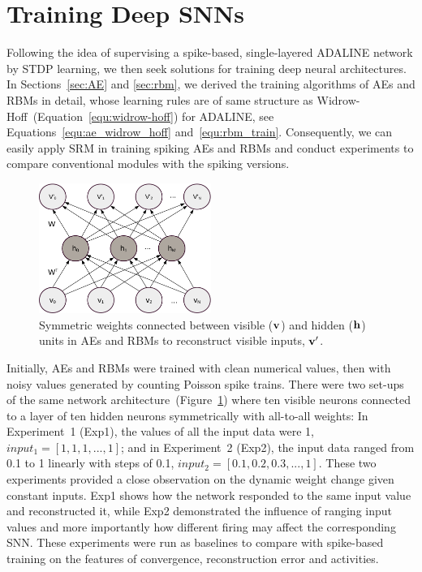 \section{Training Deep SNNs}
\label{sec:dSNN}
Following the idea of supervising a spike-based, single-layered ADALINE network by STDP learning, we then seek solutions for training deep neural architectures.
In Sections~\ref{sec:AE} and \ref{sec:rbm}, we \DIFdelbegin {}\DIFdelend derived the training algorithms of AEs and RBMs in detail, whose learning rules are of \DIFaddbegin {}\DIFaddend same structure as Widrow-Hoff~(Equation~\ref{equ:widrow-hoff}) for ADALINE, see Equations~\ref{equ:ae_widrow_hoff} and~\ref{equ:rbm_train}.
Consequently, we can easily apply SRM in training spiking AEs and RBMs and conduct experiments to compare conventional \DIFdelbegin {}\DIFdelend \DIFaddbegin {}\DIFaddend modules with the spiking versions.

\begin{figure}
	\centering
	\includegraphics[width=0.5\textwidth]{pics_sdlm/AE.pdf}
	\caption{Symmetric weights connected between visible ($\bf{v}$) and hidden ($\bf{h}$) units in AEs and RBMs to reconstruct visible inputs, $\bf{v'}$.}
	\label{fig:sym_conn}
\end{figure}
Initially, AEs and RBMs were trained with clean numerical values, then with noisy values generated by counting \DIFdelbegin {}\DIFdelend \DIFaddbegin {}\DIFaddend Poisson spike trains.
There were two set-ups of the same network architecture~(Figure~\ref{fig:sym_conn}) where ten visible neurons connected to a layer of ten hidden neurons symmetrically with all-to-all weights: In Experiment~1 (Exp1), the values of all the input data were 1, $input_1 = [1, 1, 1,...,1]$; and in Experiment~2 (Exp2), the input data ranged from 0.1 to 1 linearly with steps of 0.1, $input_2 = [0.1, 0.2, 0.3,...,1]$.
These two experiments provided a close observation on the dynamic weight change given constant inputs.
Exp1 shows how the network responded to the same input value and reconstructed it, while Exp2 demonstrated the influence of ranging input values and more importantly how different firing \DIFdelbegin {}\DIFdelend \DIFaddbegin {}\DIFaddend may affect the corresponding SNN.
These experiments were run as baselines to compare with spike-based training on the features of \DIFdelbegin {}\DIFdelend \DIFaddbegin {}\DIFaddend convergence, reconstruction error and \DIFdelbegin {}\DIFdelend \DIFaddbegin {}\DIFaddend activities.

